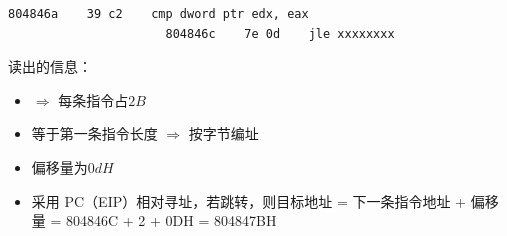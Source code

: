 \documentclass[a4paper,12pt]{article}
\begin{document}
\begin{enumerate}
\begin{analysisbox}
\begin{lstlisting}[language={[x86masm]Assembler}]
                      804846a    39 c2    cmp dword ptr edx, eax
                      804846c    7e 0d    jle xxxxxxxx
            \end{lstlisting}
            读出的信息：
            \begin{itemize}
                \item {} $\Rightarrow$ 每条指令占$2B$
                \item {} 等于第一条指令长度 $\Rightarrow$ 按字节编址
                \item {} 偏移量为$0dH$
                \item {} 采用 PC（EIP）相对寻址，若跳转，则目标地址 = 下一条指令地址 + 偏移量 = 804846C + 2 + 0DH = 804847BH
            \end{itemize}
        \end{analysisbox}
    \end{enumerate}
\end{document}

